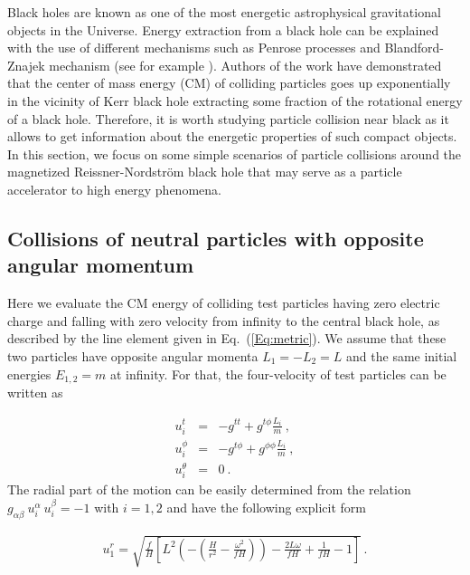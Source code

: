 \documentclass[showpacs,twocolumn,superscriptaddress]{revtex4}
\begin{document}
Black holes are known as one of the most energetic astrophysical gravitational objects in the Universe. Energy extraction from a black hole can be explained with the use of different mechanisms such as Penrose processes and Blandford-Znajek mechanism (see for example \cite{wagh85, Hawking74, Hawking75, Hawking76, wagh85a}). Authors of the work \cite{Banados09} have demonstrated that the center of mass energy (CM) of colliding particles goes up exponentially in the vicinity of Kerr black hole extracting some fraction of the rotational energy of a black hole. Therefore, it is worth studying particle collision near black as it allows to get information about the energetic properties of such compact objects. In this section, we focus on some simple scenarios of particle collisions around the magnetized Reissner-Nordstr\"{o}m black hole that may serve as a particle accelerator to high energy phenomena. 

\subsection{Collisions of neutral particles with opposite angular momentum \label{subsect1}}


Here we evaluate the CM energy of colliding test particles having zero electric charge and falling with zero velocity from infinity to the central black hole, as described by the line element given in Eq.~(\ref{Eq:metric}). We assume that these two particles have opposite angular momenta $L_1=-L_2=L$ and the same initial energies $E_{1,2}=m$ at infinity. For that, the four-velocity of test particles can be written as

\begin{eqnarray}
\nonumber \label{conU}
u_i^t&=&-g^{tt} + g^{t\phi} \frac{L_i}{m} \ ,\\
u_i^\phi&=&-g^{t\phi} + g^{\phi\phi} \frac{L_i}{m} \ ,\\\nonumber
u_i^\theta&=&0 \ .
\end{eqnarray}
%
The radial part of the motion can be easily determined from the relation $g_{\alpha\beta} \  u_i^\alpha \ u_i^\beta=-1$ with $i=1,2$ and have the following explicit form 

\begin{eqnarray}
u^r_1=\sqrt{\frac{f}{H} \left[L^2 \left(-\left(\frac{H}{r^2}-\frac{\omega^2}{f
			H}\right)\right)-\frac{2 L \omega}{f H}+\frac{1}{f H}-1\right]}\, .
\end{eqnarray}
\end{document}
